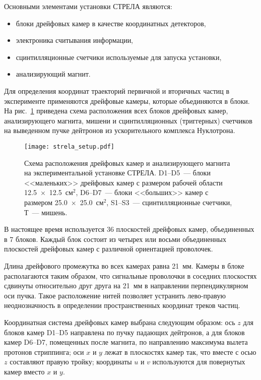 \noindent
Основными элементами установки СТРЕЛА являются:
\begin{itemize}
\item блоки дрейфовых камер в качестве координатных детекторов,
\item электроника считывания информации,
\item сцинтилляционные счетчики используемые для запуска установки,
\item анализирующий магнит.
\end{itemize}

Для определения координат траекторий первичной и вторичных частиц в эксперименте
применяются дрейфовые камеры, которые объединяются в блоки. На
рис.~\ref{fig:strela_setup} приведена схема расположения всех блоков дрейфовых
камер, анализирующего магнита, мишени и сцинтилляционных (триггерных) счетчиков
на выведенном пучке дейтронов из ускорительного комплекса Нуклотрона.

\begin{figure}[h]
  \centering
  \texttt{[image: strela\_setup.pdf]}
  \caption{Схема расположения дрейфовых камер и анализирующего магнита на
    экспериментальной установке СТРЕЛА. D1--D5~--- блоки <<маленьких>> дрейфовых
    камер с размером рабочей области 12.5~$\times$~12.5~см$^2$, D6--D7~---
    блоки <<больших>> камер с размером 25.0~$\times$~25.0~см$^2$, S1--S3~---
    сцинтилляционные счетчики,  Т~--- мишень.}
  \label{fig:strela_setup}
\end{figure}

В настоящее время используется 36 плоскостей дрейфовых камер, объединенных в 7
блоков. Каждый блок состоит из четырех или восьми объединенных плоскостей
дрейфовых камер с различной ориентацией проволочек.

Длина дрейфового промежутка во всех камерах равна 21~мм.  Камеры в блоке
располагаются таким образом, что сигнальные проволочки в соседних плоскостях
сдвинуты относительно друг друга на 21~мм в направлении перпендикулярном оси
пучка. Такое расположение нитей позволяет устранить лево-правую неоднозначность
в определении пространственных координат треков частиц.

Координатная система дрейфовых камер выбрана следующим образом: ось $z$ для
блоков камер D1--D5 направлена по пучку падающих дейтронов, а для блоков камер
D6--D7, помещенных после магнита, по направлению максимума вылета протонов
стриппинга; оси $x$ и $y$ лежат в плоскостях камер так, что вместе с осью $z$
составляют правую тройку; координаты $u$ и $v$ используются для повернутых камер
вместо $x$ и $y$.

